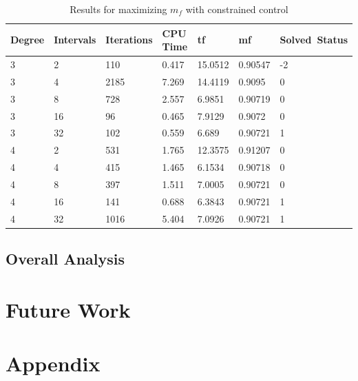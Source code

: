 \documentclass[]{article}
\begin{document}
\begin{table}
	\begin{tabular}{lllllll}
		Degree & Intervals & Iterations & CPU Time & tf & mf & Solved\ Status \\ 
		\hline 
		3 & 2 & 110 & 0.417 & 15.0512 & 0.90547 & -2 \\ 
		3 & 4 & 2185 & 7.269 & 14.4119 & 0.9095 & 0 \\ 
		3 & 8 & 728 & 2.557 & 6.9851 & 0.90719 & 0 \\ 
		3 & 16 & 96 & 0.465 & 7.9129 & 0.9072 & 0 \\ 
		3 & 32 & 102 & 0.559 & 6.689 & 0.90721 & 1 \\ 
		4 & 2 & 531 & 1.765 & 12.3575 & 0.91207 & 0 \\ 
		4 & 4 & 415 & 1.465 & 6.1534 & 0.90718 & 0 \\ 
		4 & 8 & 397 & 1.511 & 7.0005 & 0.90721 & 0 \\ 
		4 & 16 & 141 & 0.688 & 6.3843 & 0.90721 & 1 \\ 
		4 & 32 & 1016 & 5.404 & 7.0926 & 0.90721 & 1 \\ 
		\hline 
	\end{tabular}
	\caption{Results for maximizing \(m_f\) with constrained control}
	\label{table:4}
\end{table}
\FloatBarrier

	\subsection{Overall Analysis}
	
	\section{Future Work}

	
	\section{Appendix}
	
	
	
	
	
	
    
\end{document}
